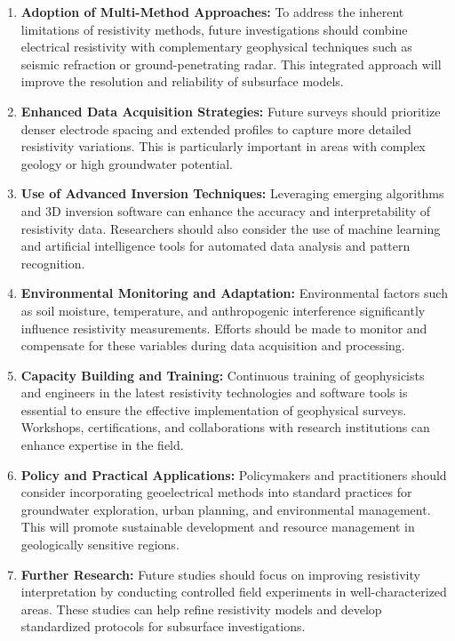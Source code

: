 \documentclass[12pt,a4paper]{report}
\begin{document}
\begin{enumerate}
    \item \textbf{Adoption of Multi-Method Approaches:} To address the inherent limitations of resistivity methods, future investigations should combine electrical resistivity with complementary geophysical techniques such as seismic refraction or ground-penetrating radar. This integrated approach will improve the resolution and reliability of subsurface models.
    
    \item \textbf{Enhanced Data Acquisition Strategies:} Future surveys should prioritize denser electrode spacing and extended profiles to capture more detailed resistivity variations. This is particularly important in areas with complex geology or high groundwater potential.
    
    \item \textbf{Use of Advanced Inversion Techniques:} Leveraging emerging algorithms and 3D inversion software can enhance the accuracy and interpretability of resistivity data. Researchers should also consider the use of machine learning and artificial intelligence tools for automated data analysis and pattern recognition.
    
    \item \textbf{Environmental Monitoring and Adaptation:} Environmental factors such as soil moisture, temperature, and anthropogenic interference significantly influence resistivity measurements. Efforts should be made to monitor and compensate for these variables during data acquisition and processing.
    
    \item \textbf{Capacity Building and Training:} Continuous training of geophysicists and engineers in the latest resistivity technologies and software tools is essential to ensure the effective implementation of geophysical surveys. Workshops, certifications, and collaborations with research institutions can enhance expertise in the field.
    
    \item \textbf{Policy and Practical Applications:} Policymakers and practitioners should consider incorporating geoelectrical methods into standard practices for groundwater exploration, urban planning, and environmental management. This will promote sustainable development and resource management in geologically sensitive regions.
    
    \item \textbf{Further Research:} Future studies should focus on improving resistivity interpretation by conducting controlled field experiments in well-characterized areas. These studies can help refine resistivity models and develop standardized protocols for subsurface investigations.
\end{enumerate}
\end{document}

